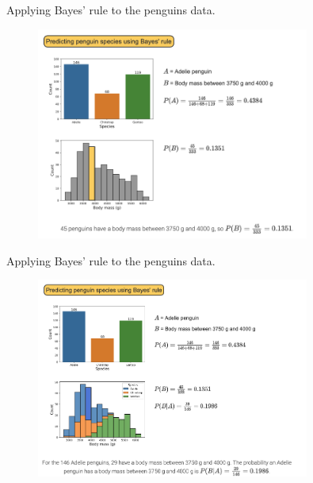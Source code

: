 \documentclass[10pt,dvipsnames]{beamer}
\begin{document}
\begin{frame}{Applying Bayes' rule to the penguins data.}
    \begin{figure}[ht]
        \centering
        \includegraphics[width=0.8\textwidth]{imgs/nb_3.png}
    \end{figure}
\end{frame}

\begin{frame}{Applying Bayes' rule to the penguins data.}
    \begin{figure}[ht]
        \centering
        \includegraphics[width=0.8\textwidth]{imgs/nb_4.png}
    \end{figure}
\end{frame}
\end{document}
